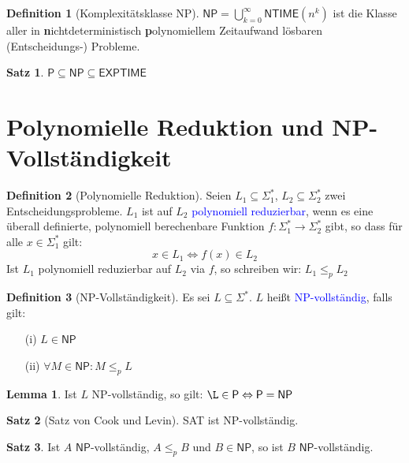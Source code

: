\documentclass{scrreprt}
\theoremstyle{definition}
\newtheorem{Definition}{Definition}[section]
\newtheorem{Satz}{Satz}[section]
\newtheorem{Lemma}{Lemma}[section]
\theoremstyle{example}
\theoremstyle{algorithm}
\begin{document}
\begin{Definition}[Komplexitätsklasse \textsf{NP}]
$\textsf{NP} = \bigcup\limits_{k=0}^\infty \textsf{NTIME}(n^k)$ ist die Klasse aller in \textbf{n}ichtdeterministisch \textbf{p}olynomiellem Zeitaufwand lösbaren (Entscheidungs-) Probleme.
\end{Definition}

\begin{Satz}
$\textsf{P}\subseteq \textsf{NP} \subseteq \textsf{EXPTIME}$
\end{Satz}

\section{Polynomielle Reduktion und \textsf{NP}-Vollständigkeit}
\begin{Definition}[Polynomielle Reduktion]
Seien $L_1 \subseteq \Sigma_1^*$, $L_2 \subseteq \Sigma_2^*$ zwei Entscheidungsprobleme. $L_1$ ist auf $L_2$ \textcolor{blue}{polynomiell reduzierbar}, wenn es eine überall definierte, polynomiell berechenbare Funktion $f:\Sigma_1^* \rightarrow \Sigma_2^*$ gibt, so dass für alle $x\in\Sigma_1^*$ gilt:
\begin{equation*}
x\in L_1 \Leftrightarrow f(x) \in L_2
\end{equation*}
Ist $L_1$ polynomiell reduzierbar auf $L_2$ via $f$, so schreiben wir: $L_1 \leq_p L_2$
\end{Definition}

\begin{Definition}[\textsf{NP}-Vollständigkeit]
Es sei $L\subseteq\Sigma^*$. $L$ heißt \textcolor{blue}{\textsf{NP}-vollständig}, falls gilt:
\begin{enumerate}
\item[(i)] $L\in \textsf{NP}$
\item[(ii)] $\forall M\in\textsf{NP}: M\leq_p L$
\end{enumerate}
\end{Definition}
\begin{Lemma}
Ist $L$ \textsf{NP}-vollständig, so gilt: $\L \in \textsf{P} \Leftrightarrow \textsf{P} = \textsf{NP}$
\end{Lemma}
\begin{Satz}[Satz von Cook und Levin]
\textsf{SAT} ist \textsf{NP}-vollständig.
\end{Satz}
\begin{Satz}
Ist $A$ $\textsf{NP}$-vollständig, $A \leq_p B$ und $B \in \textsf{NP}$, so ist $B$ $\textsf{NP}$-vollständig.
\end{Satz}
\end{document}

